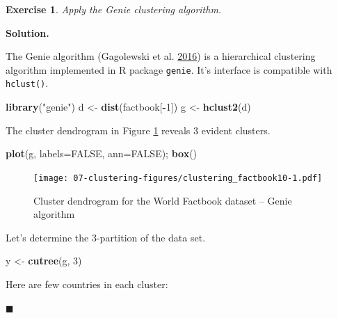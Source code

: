 \documentclass[10pt,b5paper,krantz1]{krantz}
\newenvironment{Shaded}{\begin{snugshade}}{\end{snugshade}}
\newcommand{\DataTypeTok}[1]{\textcolor[rgb]{0.27,0.27,0.27}{#1}}
\newcommand{\DecValTok}[1]{\textcolor[rgb]{0.06,0.06,0.06}{#1}}
\newcommand{\KeywordTok}[1]{\textcolor[rgb]{0.27,0.27,0.27}{\textbf{#1}}}
\newcommand{\NormalTok}[1]{#1}
\newcommand{\OperatorTok}[1]{\textcolor[rgb]{0.43,0.43,0.43}{\textbf{#1}}}
\newcommand{\OtherTok}[1]{\textcolor[rgb]{0.37,0.37,0.37}{#1}}
\newcommand{\StringTok}[1]{\textcolor[rgb]{0.5,0.5,0.5}{#1}}
\newtheorem{exercise}{Exercise}[chapter]
\newenvironment{solution}{%
\bigskip\noindent\textbf{Solution. }%
\it\ignorespaces%
\ignorespaces%
}{\ignorespaces%
\hfill$\blacksquare$%
}
\begin{document}
\begin{exercise}

Apply the Genie clustering algorithm.

\end{exercise}

\begin{solution}

The Genie algorithm (Gagolewski et al. \protect\hyperlink{ref-genie}{2016}) is a hierarchical clustering algorithm
implemented in R package \texttt{genie}. It's interface is compatible with \texttt{hclust()}.

\begin{Shaded}
\begin{Highlighting}[]
\KeywordTok{library}\NormalTok{(}\StringTok{"genie"}\NormalTok{)}
\NormalTok{d <-}\StringTok{ }\KeywordTok{dist}\NormalTok{(factbook[}\OperatorTok{-}\DecValTok{1}\NormalTok{])}
\NormalTok{g <-}\StringTok{ }\KeywordTok{hclust2}\NormalTok{(d)}
\end{Highlighting}
\end{Shaded}

The cluster dendrogram in Figure \ref{fig:clustering_factbook10}
reveals 3 evident clusters.

\begin{Shaded}
\begin{Highlighting}[]
\KeywordTok{plot}\NormalTok{(g, }\DataTypeTok{labels=}\OtherTok{FALSE}\NormalTok{, }\DataTypeTok{ann=}\OtherTok{FALSE}\NormalTok{); }\KeywordTok{box}\NormalTok{()}
\end{Highlighting}
\end{Shaded}

\begin{figure}
\hypertarget{fig:clustering_factbook10}{%
\centering
\texttt{[image: 07-clustering-figures/clustering\_factbook10-1.pdf]}
\caption{Cluster dendrogram for the World Factbook dataset -- Genie algorithm}\label{fig:clustering_factbook10}
}
\end{figure}

Let's determine the 3-partition of the data set.

\begin{Shaded}
\begin{Highlighting}[]
\NormalTok{y <-}\StringTok{ }\KeywordTok{cutree}\NormalTok{(g, }\DecValTok{3}\NormalTok{)}
\end{Highlighting}
\end{Shaded}

Here are few countries in each cluster:


\end{solution}
\end{document}

